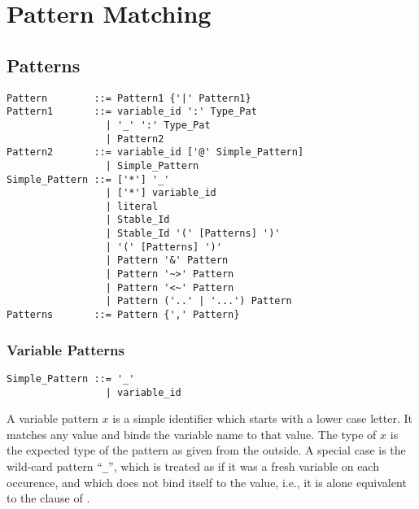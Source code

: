 
\chapter{Pattern Matching}
\label{sec:pattern-matching}






\section{Patterns}
\label{sec:patterns}

\syntax\begin{lstlisting}
Pattern        ::= Pattern1 {'|' Pattern1}
Pattern1       ::= variable_id ':' Type_Pat
                 | '_' ':' Type_Pat
                 | Pattern2
Pattern2       ::= variable_id ['@' Simple_Pattern]
                 | Simple_Pattern
Simple_Pattern ::= ['*'] '_'
                 | ['*'] variable_id
                 | literal
                 | Stable_Id
                 | Stable_Id '(' [Patterns] ')' 
                 | '(' [Patterns] ')'
                 | Pattern '&' Pattern
                 | Pattern '~>' Pattern
                 | Pattern '<~' Pattern
                 | Pattern ('..' | '...') Pattern
Patterns       ::= Pattern {',' Pattern}
\end{lstlisting}






\subsection{Variable Patterns}
\label{sec:variable-patterns}

\syntax\begin{lstlisting}
Simple_Pattern ::= '_'
                 | variable_id
\end{lstlisting}

A variable pattern $x$ is a simple identifier which starts with a lower case letter. It matches any value and binds the variable name to that value. The type of $x$ is the expected type of the pattern as given from the outside. A special case is the wild-card pattern ``\lstinline!_!'', which is treated as if it was a fresh variable on each occurence, and which does not bind itself to the value, i.e., it is alone equivalent to the  clause of . 






